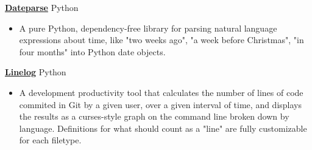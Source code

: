 \documentclass[11pt]{article}
\newcommand{\project}[2]{
    \begingroup
        \textbf{\small#1}
        \hfill\color{black!70}\small{#2}
    \endgroup
}
\newcommand{\spacevv}{
    \vspace{2mm}
}
\begin{document}
\begin{paracol}{2}
{        \iffalse
        \project{\href{https://github.com/keagud/Quackbot}{Quackbot}}{Javascript, Typescript}
        \begin{itemize}
            \item A Discord bot  
        \end{itemize}
        \spacevv
        \fi

        \project{\href{https://github.com/keagud/dateparse}{Dateparse}}{Python}
        \begin{itemize}
          \item A pure Python, dependency-free library for parsing natural language expressions about time, like "two weeks ago", "a week before Christmas", "in four months" into Python date objects. 
        \end{itemize}
        \spacevv

        \project{\href{https://github.com/keagud/linelog}{Linelog}}{Python}
        \begin{itemize}
          \item A development productivity tool that calculates the number of lines of code commited in Git by a given user, over a given interval of time, and displays the results as a curses-style graph on the command line broken down by language. Definitions for what should count as a "line" are fully customizable for each filetype.
        \end{itemize}
        \spacevv

      \iffalse
        \project{\href{https://github.com/keagud/verba}{Verba Whitakari}}{C++, Python, CMake}
        \begin{itemize}
          \item A complete port of the classic Latin morphological analysis and dictionary tool \href{https://en.wikipedia.org/wiki/William\_Whitaker\%27s\_Words>}{William Whitaker's Words}, translated and refactored from the original 1993 Ada program into modern C++. This project aims to maintain the functionality of the original in a form that can be better preserved into the future (Ada build systems are not trivial to work with in \$CURRENT\_YEAR) while improving performance and ease of use. 
        \end{itemize}    
        \fi
}
    \end{paracol}
\end{document}
